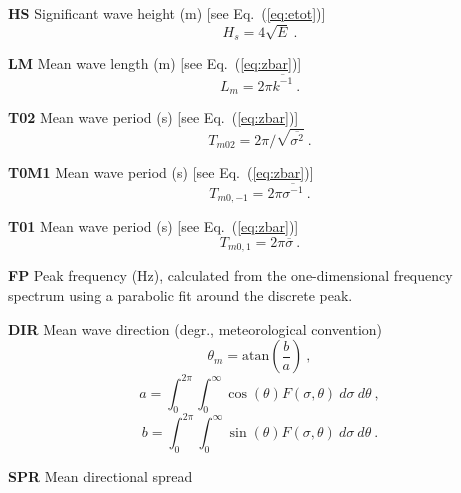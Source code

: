 \begin{list}{)\hfill}
\begin{list}{)\hfill}
            { \leftmargin 8mm 
             \rightmargin 0mm \itemsep 0mm \parsep 0mm}
\item \textbf{HS} Significant wave height (m) [see Eq.~(\ref{eq:etot})]
      \begin{equation} H_s = 4 \sqrt{E} \: . \label{eq:Hs} \end{equation}
\item \textbf{LM} Mean wave length (m) [see Eq.~(\ref{eq:zbar})]
      \begin{equation} L_m = 2\pi \overline{k^{-1}}
      \: . \label{eq:Lm} \end{equation}
\item \textbf{T02} Mean wave period (s) [see Eq.~(\ref{eq:zbar})]
      \begin{equation} T_{m02} = 2\pi /\sqrt{\overline{\sigma^{2}}}
      \: . \label{eq:Tm02} \end{equation}
\item \textbf{T0M1} Mean wave period (s) [see Eq.~(\ref{eq:zbar})]
      \begin{equation} T_{m0,-1} = 2\pi \overline{\sigma^{-1}}
      \: . \label{eq:Tm0m1} \end{equation}
\item \textbf{T01} Mean wave period (s) [see Eq.~(\ref{eq:zbar})]
      \begin{equation} T_{m0,1} = 2\pi \overline{\sigma}
      \: . \label{eq:Tm} \end{equation}
\item \textbf{FP} Peak frequency (Hz), calculated from the one-dimensional frequency
      spectrum using a parabolic fit around the discrete peak.
\item \textbf{DIR} Mean wave direction (degr., meteorological convention)
      \begin{equation} \theta_m = \mbox{atan} \left ( \frac{b}{a} \right )
      \: , \label{eq:theta_m} \end{equation} \begin{equation}
      a = \int_0^{2\pi} \int_0^\infty \cos(\theta) F(\sigma,\theta) \:
      d\sigma \: d\theta \: , \end{equation} \begin{equation}
      b = \int_0^{2\pi} \int_0^\infty \sin(\theta) F(\sigma,\theta) \:
      d\sigma \: d\theta \: . \end{equation}
\item \textbf{SPR} Mean directional spread \citep[degr.;][]{art:KVH88}

\end{list}
\end{list}
